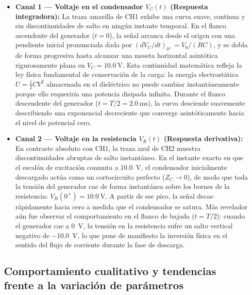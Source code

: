 \begin{itemize}
    \item \textbf{Canal 1 --- Voltaje en el condensador $V_C(t)$ (Respuesta integradora):} La traza amarilla de CH1 exhibe una curva suave, continua y sin discontinuidades de salto en ningún instante temporal. En el flanco ascendente del generador ($t = 0$), la señal arranca desde el origen con una pendiente inicial pronunciada dada por $(dV_C/dt)_{0^+} = V_0 / (RC)$, y se dobla de forma progresiva hasta alcanzar una meseta horizontal asintótica rigurosamente plana en $V_C = \qty{10,0}{\volt}$. Esta continuidad matemática refleja la ley física fundamental de conservación de la carga: la energía electrostática $U = \frac{1}{2} C V^2$ almacenada en el dieléctrico no puede cambiar instantáneamente porque ello requeriría una potencia disipada infinita. Durante el flanco descendente del generador ($t = T/2 = \qty{2,0}{\milli\second}$), la curva desciende suavemente describiendo una exponencial decreciente que converge asintóticamente hacia el nivel de potencial cero.
    
    \item \textbf{Canal 2 --- Voltaje en la resistencia $V_R(t)$ (Respuesta derivativa):} En contraste absoluto con CH1, la traza azul de CH2 muestra discontinuidades abruptas de salto instantáneo. En el instante exacto en que el escalón de excitación conmuta a \qty{10,0}{\volt}, el condensador inicialmente descargado actúa como un cortocircuito perfecto ($Z_C \to 0$), de modo que toda la tensión del generador cae de forma instantánea sobre los bornes de la resistencia: $V_R(0^+) = \qty{10,0}{\volt}$. A partir de ese pico, la señal decae rápidamente hacia cero a medida que el condensador se satura. Más revelador aún fue observar el comportamiento en el flanco de bajada ($t = T/2$): cuando el generador cae a \qty{0}{\volt}, la tensión en la resistencia sufre un salto vertical negativo de \qty{-10,0}{\volt}, lo que pone de manifiesto la inversión física en el sentido del flujo de corriente durante la fase de descarga.
\end{itemize}

\subsection{Comportamiento cualitativo y tendencias frente a la variación de parámetros}


